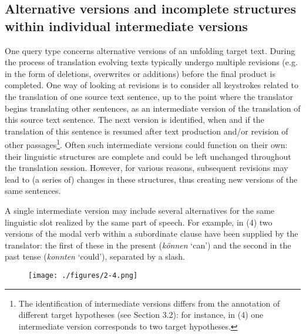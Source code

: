 \documentclass[output=paper]{LSP/langsci}
\begin{document}
\subsection{Alternative versions and incomplete structures within individual intermediate versions}
One query type concerns alternative versions of an unfolding target text. During the process of translation evolving texts typically undergo multiple revisions (e.g. in the form of deletions, overwrites or additions) before the final product is completed. One way of looking at revisions is to consider all keystrokes related to the translation of one source text sentence, up to the point where the translator begins translating other sentences, as an intermediate version of the translation of this source text sentence. The next version is identified, when and if the translation of this sentence is resumed after text production and/or revision of other passages\footnote{The identification of intermediate versions differs from the annotation of different target hypotheses (see Section 3.2): for instance, in (4) one intermediate version corresponds to two target hypotheses.}. Often such intermediate versions could function on their own: their linguistic structures are complete and could be left unchanged throughout the translation session. However, for various reasons, subsequent revisions may lead to (a series of) changes in these structures, thus creating new versions of the same sentences.

A single intermediate version may include several alternatives for the same linguistic slot realized by the same part of speech. For example, in (4) two versions of the modal verb within a subordinate clause have been supplied by the translator: the first of these in the present (\textit{können} ‘can’) and the second in the past tense (\textit{konnten} ‘could’), separated by a slash.\newline 


\begin{figure}
\texttt{[image: ./figures/2-4.png]}
\end{figure}

\end{document}
